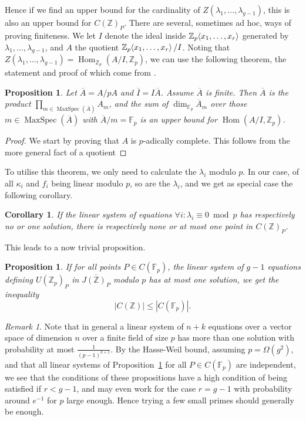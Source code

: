 \documentclass[12pt]{article}
\newcommand{\Z}{\mathbb{Z}}
\newcommand{\F}{\mathbb{F}}
\renewcommand{\angle}[1]{\hspace{-2pt}\left\langle #1 \right\rangle}
\DeclareMathOperator{\Hom}{Hom}
\DeclareMathOperator{\MaxSpec}{MaxSpec}
\theoremstyle{plain}
\newtheorem{cor}[thm]{Corollary} %
\newtheorem{prop}[thm]{Proposition} %
\theoremstyle{definition}
\theoremstyle{remark}
\newtheorem{rem}[thm]{Remark} %
\begin{document}
Hence if we find an upper bound for the cardinality of $Z(\lambda_1,\dots,\lambda_{g-1})$, this is also an upper bound for $C(\Z)_P$. There are several, sometimes ad hoc, ways of proving finiteness. We let $I$ denote the ideal inside $\Z_p\angle{x_1,\dots,x_r}$ generated by $\lambda_1,\dots,\lambda_{g-1}$, and $A$ the quotient $\Z_p\angle{x_1,\dots,x_r}/I$. Noting that $Z(\lambda_1,\dots,\lambda_{g-1}) = \Hom_{\Z_p}(A/I,\Z_p)$, we can use the following theorem, the statement and proof of which come from \citep{edixhoven20}.

\begin{prop}
\label{prop:finedix}
Let $\overline{A} = A/pA$ and $\overline{I} = I\overline{A}$. Assume $\overline{A}$ is finite. Then $\overline{A}$ is the product $\prod_{m \in \MaxSpec(\overline{A})} A_m$, and the sum of $\dim_{\F_p} \overline{A}_m$ over those $m\in \MaxSpec(\overline{A})$ with $\overline{A}/m = \F_p$ is an upper bound for $\Hom(A/I,\Z_p)$.
\end{prop}
\begin{proof}
We start by proving that $A$ is $p$-adically complete. This follows from the more general fact of a quotient
\end{proof}

To utilise this theorem, we only need to calculate the $\lambda_i$ modulo $p$. In our case, of all $\kappa_i$ and $f_i$ being linear modulo $p$, so are the $\lambda_i$, and we get as special case the following corollary.
\begin{cor}
\label{cor:finedixlinear}
If the linear system of equations $\forall i: \lambda_i \equiv 0 \bmod p$ has respectively no or one solution, there is respectively none or at most one point in $C(\Z)_P$.
\end{cor}

This leads to a now trivial proposition.
\begin{prop}
\label{prop:linchabauty}
If for all points $P \in C(\F_p)$, the linear system of $g-1$ equations defining $U(\Z_p)_P$ in $\overline{J(\Z)_P}$ modulo $p$ has at most one solution, we get the inequality
\[
|C(\Z)| \leq |C(\F_p)|.
\]
\end{prop}

\begin{rem}
\label{rem:prob}
Note that in general a linear system of $n + k$ equations over a vector space of dimension $n$ over a finite field of size $p$ has more than one solution with probability at most $\frac{1}{(p-1)^{k+1}}$. By the Hasse-Weil bound, assuming $p = \Omega(g^2)$, and that all linear systems of Proposition~\ref{prop:linchabauty} for all $P \in C(\F_p)$ are independent, we see that the conditions of these propositions have a high condition of being satisfied if $r<g-1$, and may even work for the case $r = g-1$ with probability around $e^{-1}$ for $p$ large enough. Hence trying a few small primes should generally be enough.
\end{rem}
\end{document}
